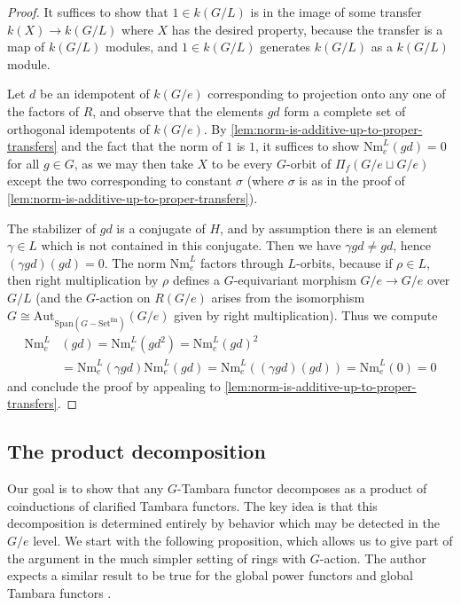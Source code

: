 \documentclass[11pt,dvipsnames]{amsart}
\theoremstyle{BoldRemark}
\newcommand{\Set}{\mathrm{Set}}
\begin{document}
\begin{proof}
    It suffices to show that $1 \in k(G/L)$ is in the image of some transfer $k(X) \rightarrow k(G/L)$ where $X$ has the desired property, because the transfer is a map of $k(G/L)$ modules, and $1 \in k(G/L)$ generates $k(G/L)$ as a $k(G/L)$ module.
		
	Let $d$ be an idempotent of $k(G/e)$ corresponding to projection onto any one of the factors of $R$, and observe that the elements $gd$ form a complete set of orthogonal idempotents of $k(G/e)$. By \cref{lem:norm-is-additive-up-to-proper-transfers} and the fact that the norm of $1$ is $1$, it suffices to show $\mathrm{Nm}_e^L(gd) = 0$ for all $g \in G$, as we may then take $X$ to be every $G$-orbit of $\Pi_f (G/e \sqcup G/e)$ except the two corresponding to constant $\sigma$ (where $\sigma$ is as in the proof of \cref{lem:norm-is-additive-up-to-proper-transfers}). 
	
	The stabilizer of $gd$ is a conjugate of $H$, and by assumption there is an element $\gamma \in L$ which is not contained in this conjugate. Then we have $\gamma gd \neq gd$, hence $(\gamma g d)(gd) = 0$. The norm $\mathrm{Nm}_e^L$ factors through $L$-orbits, because if $\rho \in L$, then right multiplication by $\rho$ defines a $G$-equivariant morphism $G/e \rightarrow G/e$ over $G/L$ (and the $G$-action on $R(G/e)$ arises from the isomorphism $G \cong \mathrm{Aut}_{\mathrm{Span}(G-\Set^{\mathrm{fin}})}(G/e)$ given by right multiplication). Thus we compute 
    \begin{align*}
        \mathrm{Nm}_e^L & (gd) = \mathrm{Nm}_e^L(gd^2) = \mathrm{Nm}_e^L(gd)^2 \\
        & = \mathrm{Nm}_e^L(\gamma gd) \mathrm{Nm}_e^L(gd) = \mathrm{Nm}_e^L((\gamma gd)(gd)) = \mathrm{Nm}_e^L(0) = 0 
    \end{align*}
    and conclude the proof by appealing to \cref{lem:norm-is-additive-up-to-proper-transfers}.
\end{proof}

\subsection{The product decomposition}\label{subsec:product-decomp}

Our goal is to show that any $G$-Tambara functor decomposes as a product of coinductions of clarified Tambara functors. The key idea is that this decomposition is determined entirely by behavior which may be detected in the $G/e$ level. We start with the following proposition, which allows us to give part of the argument in the much simpler setting of rings with $G$-action. The author expects a similar result to be true for the global power functors \cite{Sch18} and global Tambara functors \cite{Krs20}.
\end{document}
